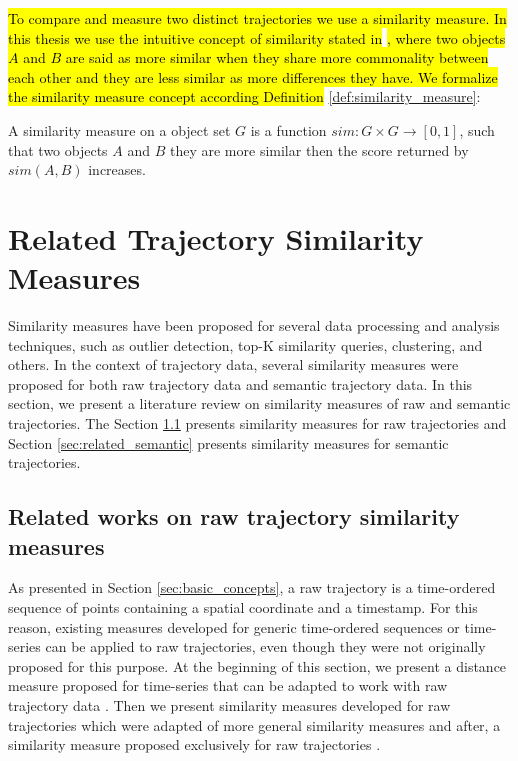 \hl{To compare and measure two distinct trajectories we use a similarity measure. In this thesis we use the intuitive concept of similarity stated in }\cite{lin1998information}\hl{, where two objects $A$ and $B$ are said as more similar when they share more commonality between each other and they are less similar as more differences they have. We formalize the similarity measure concept according Definition }\ref{def:similarity_measure}:

\begin{definition}
\label{def:similarity_measure}
A similarity measure on a object set $G$ is a function $sim: G \times G \to [0,1]$, such that two objects $A$ and $B$ they are more similar then the score returned by $sim(A, B)$ increases.
\end{definition}

\section{Related Trajectory Similarity Measures} \label{sec:related_measures}

Similarity measures have been proposed for several data processing and analysis techniques, such as outlier detection, top-K similarity queries, clustering, and others. In the context of trajectory data, several similarity measures were proposed for both raw trajectory data and semantic trajectory data. In this section, we present a literature review on similarity measures of raw and semantic trajectories.
The Section \ref{sec:related_raw} presents similarity measures for raw trajectories and Section \ref{sec:related_semantic} presents similarity measures for semantic trajectories.


\subsection{Related works on raw trajectory similarity measures} \label{sec:related_raw}
{As presented in Section {\ref{sec:basic_concepts},} a raw trajectory is a time-ordered sequence of points containing a spatial coordinate and a timestamp. For this reason, existing measures developed for generic time-ordered sequences or time-series can be applied to raw trajectories, even though they were not originally proposed for this purpose. At the beginning of this section, we present a distance measure proposed for time-series }\cite{berndt1994using}{ that can be adapted to work with raw trajectory data }\cite{ten2007multi}{. Then we present similarity measures developed for raw trajectories which were adapted of more general similarity measures }\cite{eiter1994computing, Ding:2008:ESJ:1440463.1440989, vlachos2002discovering, Chen:2004:MLE:1316689.1316758, Chen:2005:RFS:1066157.1066213}{ and after, a similarity measure proposed exclusively for raw trajectories }\cite{Furtado-UMS-2018}.

